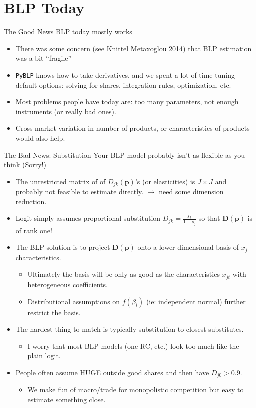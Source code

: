 \section{BLP Today}


\begin{frame}{The Good News}
BLP today mostly works
\begin{itemize}
    \item There was some concern (see Knittel Metaxoglou 2014) that BLP estimation was a bit ``fragile''
    \item \texttt{PyBLP} knows how to take derivatives, and we spent a lot of time tuning default options: solving for shares, integration rules, optimization, etc.
    \item Most problems people have today are: \alert{too many parameters, not enough instruments} (or really bad ones).
    \item Cross-market variation in number of products, or characteristics of products would also help.
\end{itemize}
\end{frame}

\begin{frame}{The Bad News: Substitution}
Your BLP model probably isn't as flexible as you think (Sorry!)
\begin{itemize}
\item The unrestricted matrix of of $D_{jk}(\symbf{p})$'s (or elasticities) is $J \times J$ and probably not feasible to estimate directly. $\rightarrow$ need some \alert{dimension reduction}.
\item Logit simply assumes proportional substitution ${D}_{jk}=\frac{s_k}{1-s_{j}}$ so that $\symbf{D}(\symbf{p})$ is of rank one!
\item The BLP solution is to project $\symbf{D}(\symbf{p})$ onto a lower-dimensional basis of $x_{j}$ characteristics.
\begin{itemize}
\item Ultimately the basis will be only as good as the characteristics $x_{jt}$ with heterogeneous coefficients.
\item Distributional assumptions on $f(\beta_i)$ (ie: independent normal) further restrict the basis.
\end{itemize}
\item The hardest thing to match is typically \alert{substitution to closest substitutes}.
\begin{itemize}
\item I worry that most BLP models (one RC, etc.) look too much like the plain logit.
\end{itemize}
\item People often assume \alert{HUGE outside good shares} and then have $D_{j0}>0.9$.
\begin{itemize}
    \item We make fun of macro/trade for \alert{monopolistic competition} but easy to estimate something close.
\end{itemize}
\end{itemize}

\end{frame}


